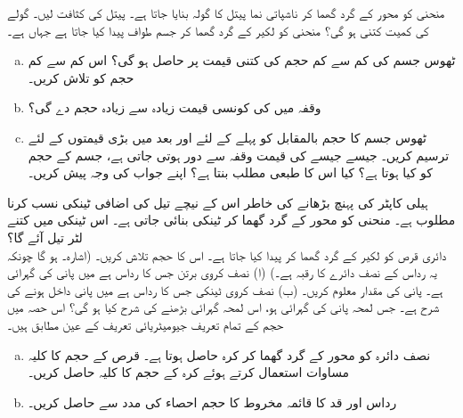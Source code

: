 منحنی  کو  محور کے گرد گھما کر ناشپاتی نما پیتل کا  گولہ بنایا جاتا ہے۔ پیتل کی کثافت  لیں۔ گولے کی کمیت کتنی ہو گی؟
منحنی  کو لکیر  کے گرد گھما کر جسم طواف پیدا کیا جاتا ہے جہاں  ہے۔
\begin{enumerate}[a.]
\item
ٹھوس جسم کی کم سے کم حجم  کی کتنی قیمت پر حاصل ہو گی؟ اس کم سے کم حجم کو تلاش کریں۔
\item
وقفہ  میں کی کونسی قیمت زیادہ سے زیادہ حجم دے گی؟
\item
ٹھوس جسم کا حجم بالمقابل  کو پہلے  کے لئے اور بعد میں بڑی قیمتوں کے لئے ترسیم کریں۔ جیسے جیسے   کی قیمت وقفہ  سے دور ہوتی جاتی ہے، جسم کے حجم کو کیا ہوتا ہے؟ کیا اس کا طبعی مطلب بنتا ہے؟ اپنے جواب کی وجہ پیش کریں۔
\end{enumerate}
ہیلی کاپٹر کی پہنچ  بڑھانے کی خاطر اس کے نیچے تیل کی اضافی ٹینکی نسب کرنا مطلوب ہے۔ منحنی  کو  محور کے گرد گھما کر ٹینکی بنائی جاتی ہے۔ اس ٹینکی میں کتنے لٹر تیل آئے گا؟
\\
دائری قرص  کو لکیر  کے گرد گھما کر  پیدا کیا جاتا ہے۔ اس کا حجم تلاش کریں۔ (اشارہ۔  ہو گا چونکہ یہ رداس  کے نصف دائرے کا رقبہ ہے۔)
(ا) نصف کروی برتن جس کا رداس  ہے میں پانی کی گہرائی  ہے۔ پانی کی مقدار معلوم کریں۔ (ب) نصف کروی ٹینکی جس کا رداس  ہے میں پانی داخل ہونے کی شرح  ہے۔ جس لمحہ پانی کی گہرائی  ہو، اس لمحہ گہرائی بڑھنے کی شرح کیا ہو گی؟
اس حصہ میں حجم کے تمام تعریف جیومیٹریائی تعریف کے عین مطابق ہیں۔
\begin{enumerate}[a.]
\item
نصف دائرہ  کو  محور کے گرد گھما کر کرہ حاصل ہوتا ہے۔ قرص کے حجم کا کلیہ مساوات  استعمال کرتے ہوئے کرہ کے حجم کا کلیہ  حاصل کریں۔
\item
رداس  اور قد  کا قائمہ مخروط کا حجم احصاء کی مدد سے حاصل کریں۔
\end{enumerate}


